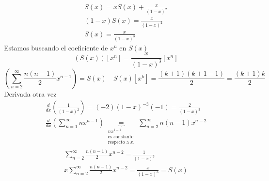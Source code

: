 \documentclass[../main.tex]{subfiles}
\begin{document}
\begin{gather*}
	S(x) = xS(x) + \frac{x}{(1-x)^2} \\
	(1-x)S(x) = \frac{x}{(1-x)^2}\\
	S(x) = \frac{x}{(1-x)^3}
\end{gather*}
Estamos buscando el coeficiente de $x^n$ en $S(x)$
\[
	\left(
		S(x)
	\right)
	\left[
		x^n
	\right]
	=
	\frac{x}{(1-x)^3}
	\left[
		x^n
	\right]
\]
\[
	\left(
		\sum_{n=2}^\infty
		\frac{n(n-1)}{2}
		x^{n-1}
	\right) =
	S(x) \quad
	S(x)[x^k] = \frac{(k+1)(k+1-1)}{2} =
	\boxed
	{
		\frac{(k+1)k}{2}
	}
\]
Derivada otra vez
\begin{gather*}
	\frac{d}{dx}
	\left(
		\frac{1}{(1-x)^2}
	\right)
	=
	(-2)(1-x)^{-3}(-1) = \frac{2}{(1-x)^3} \\
	\frac{d}{dx}
	\left(
		\sum_{n=1}^\infty
		nx^{n-1}
	\right)
	\underbrace
	{
		=
	}_
	{
		\substack
		{
			nx^{1-1}\\
			\text{es constante}\\
			\text{respecto a $x$.}
		}
	}
	\sum_{n=2}^\infty
	n(n-1)
	x^{n-2}
\end{gather*}
\begin{gather*}
	\sum_{n=2}^\infty
	\frac{n(n-1)}{2}
	x^{n-2} = \frac{1}{(1-x)^3} \\
	x\sum_{n=2}^\infty
	\frac{n(n-1)}{2}
	x^{n-2} = \frac{x}{(1-x)^3} = S(x)
\end{gather*}
\end{document}
